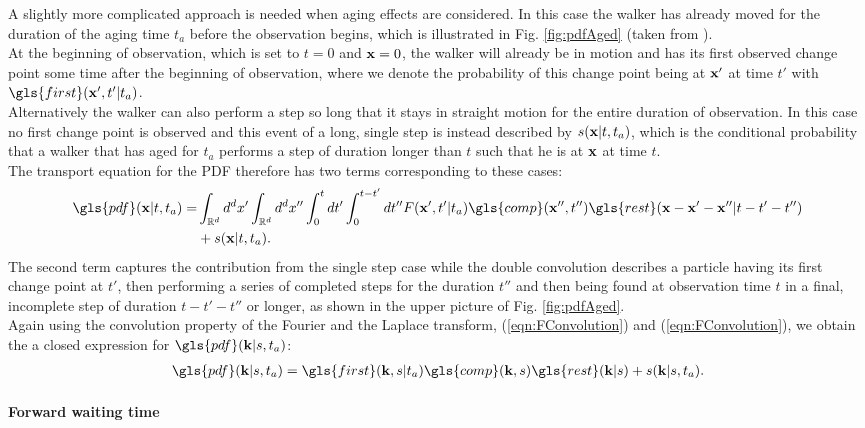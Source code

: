 A slightly more complicated approach is needed when aging effects are considered. In this case the walker has already moved for the duration of the aging time $t_a$ before the observation begins, which is illustrated in Fig. \ref{fig:pdfAged} (taken from \cite{bothe}). \\
At the beginning of observation, which is set to $t=0$ and $\mathbf{ x }=0$, the walker will already be in motion and has its first observed change point some time after the beginning of observation, where we denote the probability of this change point being at $\mathbf{ x' }$ at time $t'$ with $\gls{first}(\ve{x}',t'|t_a)$. \\
Alternatively the walker can also perform a step so long that it stays in straight motion for the entire duration of observation. In this case  no first change point is observed and this event of a long, single step is instead described by $s(\mathbf{ x }|t,t_a)$, which is the conditional probability that a walker that has aged for $t_a$ performs a step of duration longer than $t$ such that he is at $\mathbf{ x }$ at time $t$. \\

The transport equation for the \gls{PDF} therefore has two terms corresponding to these cases:
%
\begin{align}
\gls{pdf}(\ve{x}|t,t_a) = &\int_{\mathbb{R}^d} d^{d}x' \int_{\mathbb{R}^d} d^{d}x'' \int_{0}^{t} dt' \int_{0}^{t-t'} d t''   F(\ve{x}',t'|t_a)  \gls{comp}(\ve{x}'',t'') \gls{rest}(\ve{x}-\ve{x}'-\ve{x}''| t-t'-t'') \nonumber \\
&+ s(\ve{x}|t,t_a).
\end{align}
%
The second term captures the contribution from the single step case while the double convolution describes a particle having its first change point at $t'$, then performing a series of completed steps for the duration $t''$ and then being found at observation time $t$ in a final, incomplete step of duration $t-t'-t''$ or longer, as shown in the upper picture of Fig. \ref{fig:pdfAged}.\\
Again using the convolution property of the Fourier and the Laplace transform,  (\ref{eqn:FConvolution}) and (\ref{eqn:FConvolution}), we obtain the a closed expression for $\gls{pdf}(\ve{k}|s,t_a)$:
%
\begin{align}
\gls{pdf}(\ve{k}|s,t_a) =  \gls{first}(\ve{k},s|t_a)  \gls{comp}(\ve{k},s) \gls{rest}(\ve{k}|s) + s(\ve{k}|s,t_a) \label{eqn:pdfAgedFourierLaplace}.
\end{align}


\paragraph{Forward waiting time}

